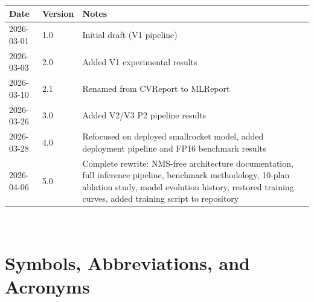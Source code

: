\documentclass[12pt, titlepage]{article}
\begin{document}
\begin{tabularx}{\textwidth}{p{3cm}p{2cm}X}
  \toprule {\bf Date} & {\bf Version} & {\bf Notes}                              \\
  \midrule
  2026-03-01          & 1.0           & Initial draft (V1 pipeline)              \\
  2026-03-03          & 2.0           & Added V1 experimental results            \\
  2026-03-10          & 2.1           & Renamed from CVReport to MLReport        \\
  2026-03-26          & 3.0           & Added V2/V3 P2 pipeline results          \\
  2026-03-28          & 4.0           & Refocused on deployed smallrocket model,
  added deployment pipeline and FP16 benchmark results                           \\
  2026-04-06          & 5.0           & Complete rewrite: NMS-free architecture
  documentation, full inference pipeline, benchmark methodology,
  10-plan ablation study, model evolution history, restored
  training curves, added training script to repository                           \\
  \bottomrule
\end{tabularx}

~\\

\newpage
\tableofcontents
\newpage

\section{Symbols, Abbreviations, and Acronyms}
\end{document}
